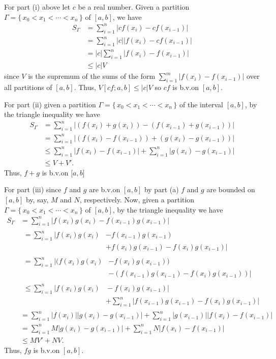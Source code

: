 \begin{solution}
  For part (i) above let \(c\) be a real number. Given a partition
  \(\Gamma=\{\,x_0<x_1<\cdots<x_n\,\}\) of \([a,b]\), we have
  \begin{align*}
    S_\Gamma
    &=\sum_{i=1}^n |cf(x_i)-cf(x_{i-1})|\\
    &=\sum_{i=1}^n |c||f(x_i)-cf(x_{i-1})|\\
    &=|c|\sum_{i=1}^n|f(x_i)-f(x_{i-1})|\\
    &\leq |c| V
  \end{align*}
  since \(V\) is the supremum of the sums of the form
  \(\sum_{i=1}^m|f(x_i)-f(x_{i-1})|\) over all partitions of
  \([a,b]\). Thus, \(V[cf;a,b]\leq |c|V\) so \(cf\) is b.v.\@ on \([a,b]\).

  For part (ii) given a partition \(\Gamma=\{\,x_0<x_1<\cdots<x_n\,\}\) of
  the interval \([a,b]\), by the triangle inequality we have
  \begin{align*}
    S_\Gamma
    &=\sum_{i=1}^n\left|(f(x_i)+g(x_i))-(f(x_{i-1})+g(x_{i-1}))\right|\\
    &=\sum_{i=1}^n\left|(f(x_i)-f(x_{i-1}))+(g(x_i)-g(x_{i-1}))\right|\\
    &\leq\sum_{i=1}^n|f(x_i)-f(x_{i-1})|+\sum_{i=1}^n|g(x_i)-g(x_{i-1})|\\
    &\leq V+V'.
  \end{align*}
  Thus, \(f+g\) is b.v.\@ on \([a,b\)]

  For part (iii) since \(f\) and \(g\) are b.v.\@ on \([a,b]\) by part (a)
  \(f\) and \(g\) are bounded on \([a,b]\) by, say, \(M\) and \(N\),
  respectively. Now, given a partition
  \(\Gamma=\{\,x_0<x_1<\cdots<x_n\,\}\) of \([a,b]\), by the triangle
  inequality we have
  \begin{align*}
    S_{\Gamma}
    &=\sum_{i=1}^n\left|f(x_i)g(x_i)-f(x_{i-1})g(x_{i-1})\right|\\
    &\begin{aligned} =\sum_{i=1}^n
      \left|f(x_i)g(x_i)\right.{}&{}\left.-f(x_{i-1})g(x_{i-1})\right.\\
      &\left.+f(x_i)g(x_{i-1})-f(x_i)g(x_{i-1})\right|
    \end{aligned}\\
    &\begin{aligned} =\sum_{i=1}^n
      \left|(f(x_i)g(x_i)\right.{}&{}\left.-f(x_i)g(x_{i-1}))\right.\\
      &\left.-(f(x_{i-1})g(x_{i-1})-f(x_i)g(x_{i-1}))\right|
    \end{aligned}\\
    &\begin{aligned}
      \leq\sum_{i=1}^n|f(x_i)g(x_i){}&{}-f(x_i)g(x_{i-1})|\\
      &+\sum_{i=1}^n|f(x_{i-1})g(x_{i-1})-f(x_i)g(x_{i-1})|
    \end{aligned}\\
    &=\sum_{i=1}^n|f(x_i)||g(x_i)-g(x_{i-1})|+\sum_{i=1}^n|g(x_{i-1})||f(x_i)-f(x_{i-1})|\\
    &=\sum_{i=1}^n
      M|g(x_i)-g(x_{i-1})|+\sum_{i=1}^n N|f(x_i)-f(x_{i-1})|\\
    &\leq MV'+NV.
  \end{align*}
  Thus, \(fg\) is b.v.\@ on \([a,b]\).


\end{solution}

